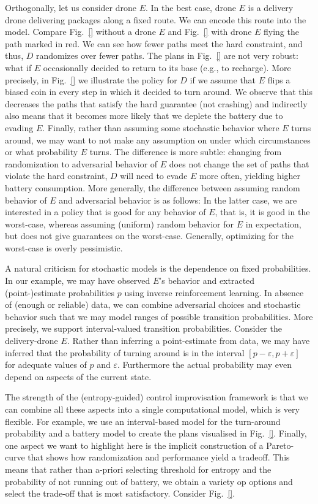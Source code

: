 Orthogonally, let us consider drone $E$. 
In the best case, drone $E$ is a delivery drone delivering packages along a fixed route. We can encode this route into the model. 
Compare Fig.~\ref{} without a drone $E$ and Fig.~\ref{} with drone $E$ flying the path marked in red. 
We can see how fewer paths meet the hard constraint, and thus, $D$ randomizes over fewer paths. 
The plans in Fig.~\ref{} are not very robust: what if $E$ occasionally decided to return to its base (e.g., to recharge). More precisely, in Fig.~\ref{} we illustrate the policy for $D$ if we assume that $E$ flips a biased coin in every step in which it decided to turn around.
We observe that this decreases the paths that satisfy the hard guarantee (not crashing) and indirectly also means that it becomes more likely that we deplete the battery due to evading $E$.
Finally, rather than assuming some stochastic behavior where $E$ turns around, we may want to not make any assumption on under which circumstances or what probability $E$ turns. 
The difference is more subtle: changing from randomization to adversarial behavior of $E$ does not change the set of paths that violate the hard constraint, $D$ will need to evade $E$ more often, yielding higher battery consumption. 
More generally, the difference between assuming random behavior of $E$ and adversarial behavior is as follows: In the latter case, we are interested in a policy that is good for any behavior of $E$, that is, it is good in the worst-case, whereas assuming (uniform) random behavior for $E$ in expectation, but does not give guarantees on the worst-case. Generally, optimizing for the worst-case is overly pessimistic.

A natural criticism for stochastic models is the dependence on fixed probabilities.
 In our example, we may have observed $E$'s behavior and extracted (point-)estimate probabilities $p$ using inverse reinforcement learning. In absence of (enough or reliable) data, we can combine adversarial choices and stochastic behavior such that we may model ranges of possible transition probabilities. 
 More precisely, we support interval-valued transition probabilities. Consider the delivery-drone $E$. Rather than inferring a point-estimate from data, we may have inferred that the probability of turning around is in the interval $[p - \varepsilon, p + \varepsilon]$ for adequate values of $p$ and $\varepsilon$.  Furthermore the actual probability may even depend on aspects of the current state. 

The strength of the (entropy-guided) control improvisation framework is that we can combine all these aspects into a single computational model, which is very flexible. For example, we use an interval-based model for the turn-around probability and a battery model to create the plans visualised in Fig.~\ref{}.
Finally, one aspect we want to highlight here is the implicit construction of a Pareto-curve that shows how randomization and performance yield a tradeoff. This means that rather than a-priori selecting threshold for entropy and the probability of not running out of battery, we obtain a variety op options and select the trade-off that is most satisfactory. Consider Fig.~\ref{}.



